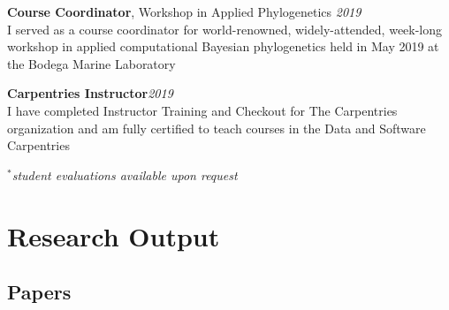 \documentclass[12pt]{article}
\begin{document}
\textbf{Course Coordinator}, Workshop in Applied Phylogenetics \hfill \emph{2019}\\
I served as a course coordinator for world-renowned, widely-attended, week-long workshop in applied computational Bayesian phylogenetics held in May 2019 at the Bodega Marine Laboratory

\textbf{Carpentries Instructor}\hfill \emph{2019}\\
I have completed Instructor Training and Checkout for The Carpentries organization and am fully certified to teach courses in the Data and Software Carpentries

$^{*}$\emph{student evaluations available upon request}

\section{Research Output}

\subsection{Papers}
\end{document}
